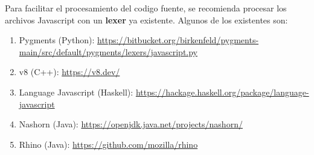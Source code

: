 \documentclass{article}
\begin{document}
Para facilitar el procesamiento del codigo fuente, se recomienda procesar los archivos Javascript
con un {\bf lexer} ya existente. Algunos de los existentes son:
\begin{enumerate}
        \item{Pygments (Python): \url{https://bitbucket.org/birkenfeld/pygments-main/src/default/pygments/lexers/javascript.py}}
        \item{v8 (C++): \url{https://v8.dev/}}
        \item{Language Javascript (Haskell): \url{https://hackage.haskell.org/package/language-javascript}}
        \item{Nashorn (Java): \url{https://openjdk.java.net/projects/nashorn/}}
        \item{Rhino (Java): \url{https://github.com/mozilla/rhino}}
\end{enumerate}
\end{document}
